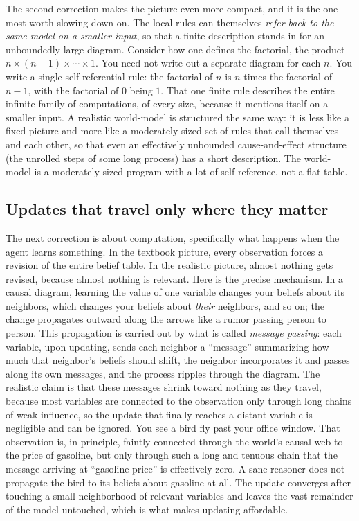 \documentclass[10pt]{article}
\theoremstyle{definition}
\theoremstyle{remark}
\begin{document}
The second correction makes the picture even more compact, and it is the one most worth slowing down on. The local rules can themselves \emph{refer back to the same model on a smaller input}, so that a finite description stands in for an unboundedly large diagram. Consider how one defines the factorial, the product $n \times (n-1) \times \cdots \times 1$. You need not write out a separate diagram for each $n$. You write a single self-referential rule: the factorial of $n$ is $n$ times the factorial of $n-1$, with the factorial of $0$ being $1$. That one finite rule describes the entire infinite family of computations, of every size, because it mentions itself on a smaller input. A realistic world-model is structured the same way: it is less like a fixed picture and more like a moderately-sized set of rules that call themselves and each other, so that even an effectively unbounded cause-and-effect structure (the unrolled steps of some long process) has a short description. The world-model is a moderately-sized program with a lot of self-reference, not a flat table.

\subsection{Updates that travel only where they matter}

The next correction is about computation, specifically what happens when the agent learns something. In the textbook picture, every observation forces a revision of the entire belief table. In the realistic picture, almost nothing gets revised, because almost nothing is relevant. Here is the precise mechanism. In a causal diagram, learning the value of one variable changes your beliefs about its neighbors, which changes your beliefs about \emph{their} neighbors, and so on; the change propagates outward along the arrows like a rumor passing person to person. This propagation is carried out by what is called \emph{message passing}: each variable, upon updating, sends each neighbor a ``message'' summarizing how much that neighbor's beliefs should shift, the neighbor incorporates it and passes along its own messages, and the process ripples through the diagram. The realistic claim is that these messages shrink toward nothing as they travel, because most variables are connected to the observation only through long chains of weak influence, so the update that finally reaches a distant variable is negligible and can be ignored. You see a bird fly past your office window. That observation is, in principle, faintly connected through the world's causal web to the price of gasoline, but only through such a long and tenuous chain that the message arriving at ``gasoline price'' is effectively zero. A sane reasoner does not propagate the bird to its beliefs about gasoline at all. The update converges after touching a small neighborhood of relevant variables and leaves the vast remainder of the model untouched, which is what makes updating affordable.
\end{document}
